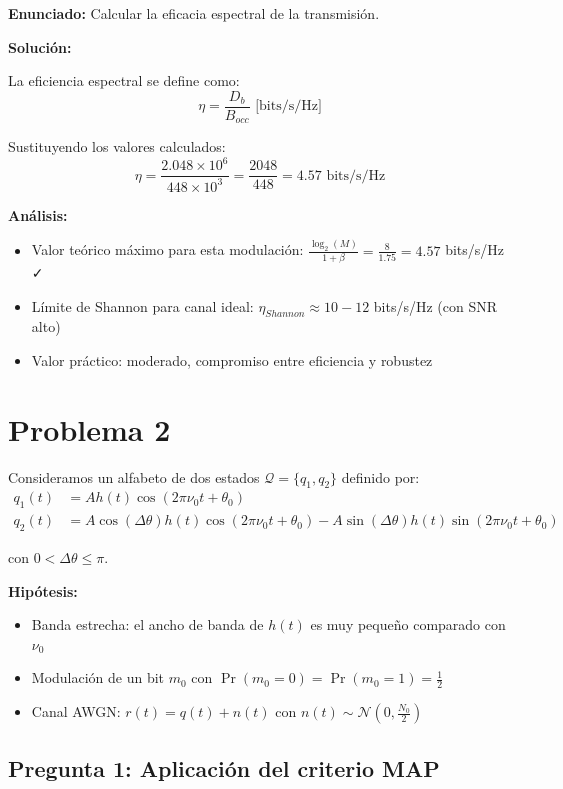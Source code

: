 \documentclass[11pt,a4paper]{article}
\begin{document}
\textbf{Enunciado:} Calcular la eficacia espectral de la transmisi\'on.

\vspace{0.3cm}
\textbf{Soluci\'on:}

La eficiencia espectral se define como:
\[
\eta = \frac{D_b}{B_{occ}} \text{ [bits/s/Hz]}
\]

Sustituyendo los valores calculados:
\[
\eta = \frac{2.048 \times 10^6}{448 \times 10^3} = \frac{2048}{448} = \boxed{4.57 \text{ bits/s/Hz}}
\]

\textbf{An\'alisis:}
\begin{itemize}
    \item Valor te\'orico m\'aximo para esta modulaci\'on: $\frac{\log_2(M)}{1+\beta} = \frac{8}{1.75} = 4.57$ bits/s/Hz ✓
    \item L\'imite de Shannon para canal ideal: $\eta_{Shannon} \approx 10-12$ bits/s/Hz (con SNR alto)
    \item Valor pr\'actico: moderado, compromiso entre eficiencia y robustez
\end{itemize}



\newpage
\section*{Problema 2}

Consideramos un alfabeto de dos estados $\mathcal{Q} = \{q_1, q_2\}$ definido por:
\begin{align*}
q_1(t) &= Ah(t)\cos(2\pi\nu_0 t + \theta_0) \\
q_2(t) &= A\cos(\Delta\theta)h(t)\cos(2\pi\nu_0 t + \theta_0) - A\sin(\Delta\theta)h(t)\sin(2\pi\nu_0 t + \theta_0)
\end{align*}

con $0 < \Delta\theta \leq \pi$.

\textbf{Hip\'otesis:}
\begin{itemize}
    \item Banda estrecha: el ancho de banda de $h(t)$ es muy peque\~no comparado con $\nu_0$
    \item Modulaci\'on de un bit $m_0$ con $\Pr(m_0 = 0) = \Pr(m_0 = 1) = \frac{1}{2}$
    \item Canal AWGN: $r(t) = q(t) + n(t)$ con $n(t) \sim \mathcal{N}(0, \frac{N_0}{2})$
\end{itemize}

\subsection*{Pregunta 1: Aplicaci\'on del criterio MAP}
\end{document}
